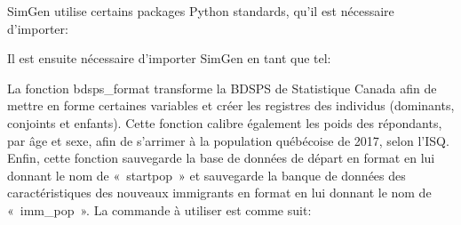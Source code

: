 \documentclass[letterpaper,10pt,french]{sphinxmanual}
\begin{document}

SimGen utilise certains packages Python standards, qu’il est nécessaire d’importer:

\begin{sphinxVerbatim}[commandchars=\\\{\}]
 
   
   
     
\end{sphinxVerbatim}


Il est ensuite nécessaire d’importer SimGen en tant que tel:

\begin{sphinxVerbatim}[commandchars=\\\{\}]
 
    
\end{sphinxVerbatim}


La fonction bdsps\_format transforme la BDSPS de Statistique Canada afin de mettre en forme certaines variables et créer les registres des individus (dominants, conjoints et enfants).
Cette fonction calibre également les poids des répondants, par âge et sexe, afin de s’arrimer à la population québécoise de 2017, selon l’ISQ.
Enfin, cette fonction sauvegarde la base de données de départ en format  en lui donnant le nom de « startpop » et
sauvegarde la banque de données des caractéristiques des nouveaux immigrants en format  en lui donnant le nom de « imm\_pop ».
La commande à utiliser est comme suit:

\begin{sphinxVerbatim}[commandchars=\\\{\}]
\end{sphinxVerbatim}
\end{document}
